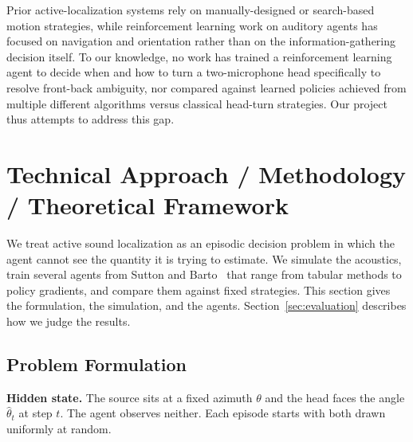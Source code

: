 \documentclass{article}
\begin{document}
Prior active-localization systems rely on manually-designed or search-based motion strategies, while reinforcement learning work on auditory agents has focused on navigation and orientation rather than on the information-gathering decision itself. To our knowledge, no work has trained a reinforcement learning agent to decide when and how to turn a two-microphone head specifically to resolve front-back ambiguity, nor compared against learned policies achieved from multiple different algorithms versus classical head-turn strategies. Our project thus attempts to address this gap.











\section{Technical Approach / Methodology / Theoretical Framework}

We treat active sound localization as an episodic decision problem in which
the agent cannot see the quantity it is trying to estimate. We simulate the
acoustics, train several agents from Sutton and
Barto~\cite{sutton1998reinforcement} that range from tabular methods to policy
gradients, and compare them against fixed strategies. This section gives the
formulation, the simulation, and the agents. Section~\ref{sec:evaluation}
describes how we judge the results.

\subsection{Problem Formulation}
\label{sec:formulation}

\textbf{Hidden state.} The source sits at a fixed azimuth $\theta$ and the
head faces the angle $\hat\theta_t$ at step $t$. The agent observes neither.
Each episode starts with both drawn uniformly at random.
\end{document}
